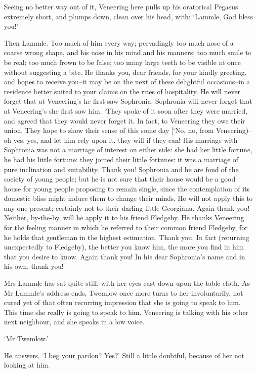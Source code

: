 Seeing no better way out of it, Veneering here pulls up his oratorical
Pegasus extremely short, and plumps down, clean over his head, with:
‘Lammle, God bless you!’

Then Lammle. Too much of him every way; pervadingly too much nose of a
coarse wrong shape, and his nose in his mind and his manners; too much
smile to be real; too much frown to be false; too many large teeth to be
visible at once without suggesting a bite. He thanks you, dear friends,
for your kindly greeting, and hopes to receive you--it may be on the
next of these delightful occasions--in a residence better suited to
your claims on the rites of hospitality. He will never forget that at
Veneering’s he first saw Sophronia. Sophronia will never forget that at
Veneering’s she first saw him. ‘They spoke of it soon after they
were married, and agreed that they would never forget it. In fact, to
Veneering they owe their union. They hope to show their sense of this
some day [‘No, no, from Veneering)--oh yes, yes, and let him rely
upon it, they will if they can! His marriage with Sophronia was not a
marriage of interest on either side: she had her little fortune, he had
his little fortune: they joined their little fortunes: it was a marriage
of pure inclination and suitability. Thank you! Sophronia and he are
fond of the society of young people; but he is not sure that their house
would be a good house for young people proposing to remain single, since
the contemplation of its domestic bliss might induce them to change
their minds. He will not apply this to any one present; certainly not
to their darling little Georgiana. Again thank you! Neither, by-the-by,
will he apply it to his friend Fledgeby. He thanks Veneering for the
feeling manner in which he referred to their common friend Fledgeby, for
he holds that gentleman in the highest estimation. Thank you. In fact
(returning unexpectedly to Fledgeby), the better you know him, the more
you find in him that you desire to know. Again thank you! In his dear
Sophronia’s name and in his own, thank you!

Mrs Lammle has sat quite still, with her eyes cast down upon the
table-cloth. As Mr Lammle’s address ends, Twemlow once more turns to her
involuntarily, not cured yet of that often recurring impression that she
is going to speak to him. This time she really is going to speak to him.
Veneering is talking with his other next neighbour, and she speaks in a
low voice.

‘Mr Twemlow.’

He answers, ‘I beg your pardon? Yes?’ Still a little doubtful, because
of her not looking at him.

